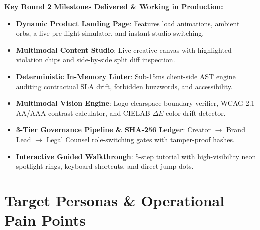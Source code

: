 \documentclass[10pt,a4paper]{article}
\begin{document}
\begin{tcolorbox}[colback=slatebg,colframe=brandblue,arc=1.5mm,boxrule=0.6pt,left=2.5mm,right=2.5mm,top=1.5mm,bottom=1.5mm]
\footnotesize
\textbf{Key Round 2 Milestones Delivered \& Working in Production:}
\begin{itemize}[leftmargin=*,itemsep=0.5pt,topsep=0.5pt]
  \item \textbf{Dynamic Product Landing Page}: Features load animations, ambient orbs, a live pre-flight simulator, and instant studio switching.
  \item \textbf{Multimodal Content Studio}: Live creative canvas with highlighted violation chips and side-by-side split diff inspection.
  \item \textbf{Deterministic In-Memory Linter}: Sub-15ms client-side AST engine auditing contractual SLA drift, forbidden buzzwords, and accessibility.
  \item \textbf{Multimodal Vision Engine}: Logo clearspace boundary verifier, WCAG 2.1 AA/AAA contrast calculator, and CIELAB $\Delta E$ color drift detector.
  \item \textbf{3-Tier Governance Pipeline \& SHA-256 Ledger}: Creator $\rightarrow$ Brand Lead $\rightarrow$ Legal Counsel role-switching gates with tamper-proof hashes.
  \item \textbf{Interactive Guided Walkthrough}: 5-step tutorial with high-visibility neon spotlight rings, keyboard shortcuts, and direct jump dots.
\end{itemize}
\end{tcolorbox}

\vspace{-0.25cm}
\section{Target Personas \& Operational Pain Points}
\end{document}
